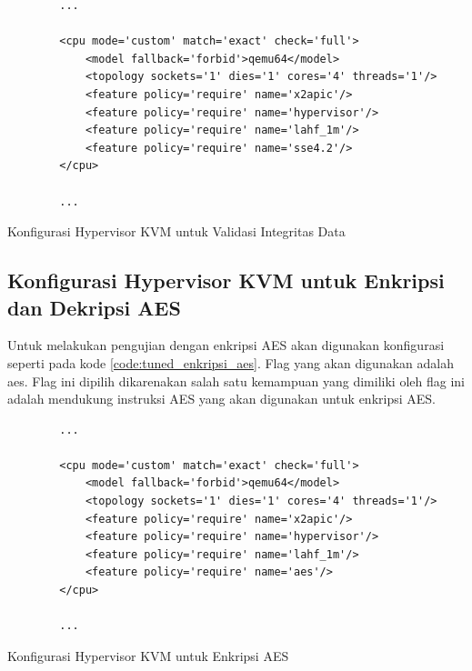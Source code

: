 \begin{listing}[H]
    \begin{verbatim}
        ...

        <cpu mode='custom' match='exact' check='full'>
            <model fallback='forbid'>qemu64</model>
            <topology sockets='1' dies='1' cores='4' threads='1'/>
            <feature policy='require' name='x2apic'/>
            <feature policy='require' name='hypervisor'/> 
            <feature policy='require' name='lahf_1m'/>
            <feature policy='require' name='sse4.2'/>
        </cpu>
        
        ...
    \end{verbatim}
    \caption{Konfigurasi Hypervisor KVM untuk Validasi Integritas Data}
    \label{code:tuned_validasi_integritas_file}
\end{listing}

\subsection{Konfigurasi Hypervisor KVM untuk Enkripsi dan Dekripsi AES}
Untuk melakukan pengujian dengan enkripsi AES akan digunakan konfigurasi seperti pada kode \ref{code:tuned_enkripsi_aes}. Flag yang akan digunakan adalah aes. Flag ini dipilih dikarenakan salah satu kemampuan yang dimiliki oleh flag ini adalah mendukung instruksi AES yang akan digunakan untuk enkripsi AES.

\begin{listing}[H]
    \begin{verbatim}
        ...

        <cpu mode='custom' match='exact' check='full'>
            <model fallback='forbid'>qemu64</model>
            <topology sockets='1' dies='1' cores='4' threads='1'/>
            <feature policy='require' name='x2apic'/>
            <feature policy='require' name='hypervisor'/> 
            <feature policy='require' name='lahf_1m'/>
            <feature policy='require' name='aes'/>
        </cpu>
        
        ...
    \end{verbatim}
    \caption{Konfigurasi Hypervisor KVM untuk Enkripsi AES}
    \label{code:tuned_enkripsi_aes}
\end{listing}

